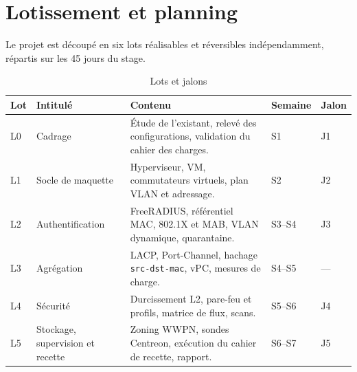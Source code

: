 \documentclass[11pt,a4paper]{article}
\newcommand{\ttb}[1]{\texttt{\small #1}}
\begin{document}
\section{Lotissement et planning}
Le projet est découpé en six lots réalisables et réversibles indépendamment, répartis sur les 45 jours du stage.

\begin{table}[H]
\centering
\caption{Lots et jalons}
\begin{tabularx}{\textwidth}{L{1.2cm} L{3.3cm} Y C{1.5cm} C{1.2cm}}
\toprule
{}\textbf{Lot} & \textbf{Intitulé} & \textbf{Contenu} & \textbf{Semaine} & \textbf{Jalon} \\
\midrule
L0 & Cadrage & Étude de l'existant, relevé des configurations, validation du cahier des charges. & S1 & J1 \\
L1 & Socle de maquette & Hyperviseur, VM, commutateurs virtuels, plan VLAN et adressage. & S2 & J2 \\
L2 & Authentification & FreeRADIUS, référentiel MAC, 802.1X et MAB, VLAN dynamique, quarantaine. & S3--S4 & J3 \\
L3 & Agrégation & LACP, Port-Channel, hachage \ttb{src-dst-mac}, vPC, mesures de charge. & S4--S5 & --- \\
L4 & Sécurité & Durcissement L2, pare-feu et profils, matrice de flux, scans. & S5--S6 & J4 \\
L5 & Stockage, supervision et recette & Zoning WWPN, sondes Centreon, exécution du cahier de recette, rapport. & S6--S7 & J5 \\
\bottomrule
\end{tabularx}
\end{table}
\end{document}
